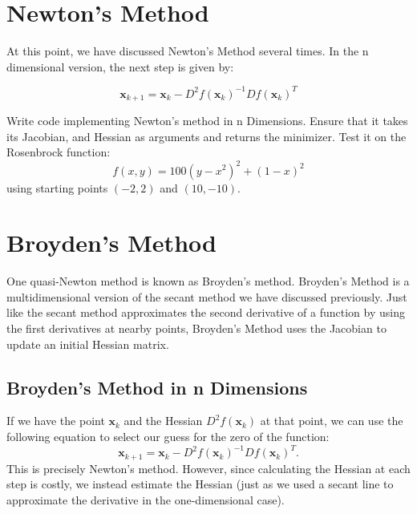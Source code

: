 

\section*{Newton's Method}
At this point, we have discussed Newton's Method several times. In the n dimensional version,
the next step is given by:

\begin{equation} \label{Eq:BasicNewton}
\mathbf{x}_{k+1} = \mathbf{x}_k - D^2f(\mathbf{x}_k)^{-1}Df(\mathbf{x}_k)^T
\end{equation}

\begin{problem}
Write code implementing Newton's method in n Dimensions. Ensure that it takes
its Jacobian, and Hessian as arguments and returns the
minimizer. Test it on the Rosenbrock function:
\[
f(x,y) = 100(y-x^2)^2 + (1-x)^2
\]
using starting points $(-2,2)$ and $(10,-10)$.
\end{problem}

\section*{Broyden's Method}
One quasi-Newton method is known as Broyden's method. Broyden's Method is a
multidimensional version of the secant method we have discussed previously.
Just like the secant method approximates the second derivative of a function by
using the first derivatives at nearby points, Broyden's Method uses
the Jacobian to update an initial Hessian matrix.

\subsection*{Broyden's Method in n Dimensions}

If we have the point $\mathbf{x}_k$ and the Hessian $D^2f(\mathbf{x}_k)$ at that point, we can use the
following equation to select our guess for the zero of the function:
\begin{equation} \label{Eq:BroydenSolve}
\mathbf{x}_{k+1} = \mathbf{x}_k-D^2f(\mathbf{x}_k)^{-1}Df(\mathbf{x}_k)^T.
\end{equation}
This is precisely Newton's method. However, since calculating the Hessian at each step is costly, we instead estimate the Hessian (just as we used a secant line to approximate the derivative in the one-dimensional case).


